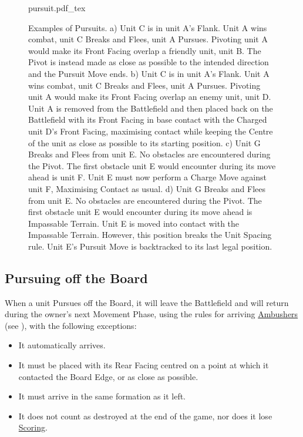 \begin{figure*}[p]
	\renewcommand{\figbiglettersize}{17}
	\begin{minipage}{0.53\textwidth}
	\def\svgwidth{\textwidth}
	{pursuit.pdf_tex}
	\end{minipage}\hfill\begin{minipage}{0.44\textwidth}
	\caption{Examples of Pursuits.\captionposttitle
		a) Unit C is in unit A's Flank. Unit A wins combat, unit C Breaks and Flees, unit A Pursues. Pivoting unit A would make its Front Facing overlap a friendly unit, unit B. The Pivot is instead made as close as possible to the intended direction and the Pursuit Move ends.\vspace*{1.5cm}\captionpar
		b) Unit C is in unit A's Flank. Unit A wins combat, unit C Breaks and Flees, unit A Pursues. Pivoting unit A would make its Front Facing overlap an enemy unit, unit D. Unit A is removed from the Battlefield and then placed back on the Battlefield with its Front Facing in base contact with the Charged unit D's Front Facing, maximising contact while keeping the Centre of the unit as close as possible to its starting position.\vspace*{3.5cm}\captionpar
		c) Unit G Breaks and Flees from unit E. No obstacles are encountered during the Pivot. The first obstacle unit E would encounter during its move ahead is unit F. Unit E must now perform a Charge Move against unit F, Maximising Contact as usual.\vspace*{4cm}\captionpar
		d) Unit G Breaks and Flees from unit E. No obstacles are encountered during the Pivot. The first obstacle unit E would encounter during its move ahead is Impassable Terrain. Unit E is moved into contact with the Impassable Terrain. However, this position breaks the Unit Spacing rule. Unit E's Pursuit Move is backtracked to its last legal position.\vspace*{1cm}%
	}
	\label{figure/pursuit}
	\end{minipage}
\end{figure*}

\subsection{Pursuing off the Board}
\label{pursuing_off_the_board}

When a unit Pursues off the Board, it will leave the Battlefield and will return during the owner's next Movement Phase, using the rules for arriving \hyperref[ambush]{Ambushers} (see ), with the following exceptions:
\begin{itemize}
	\item It automatically arrives.
	\item It must be placed with its Rear Facing centred on a point at which it contacted the Board Edge, or as close as possible.
	\item It must arrive in the same formation as it left.
	\item It does not count as destroyed at the end of the game, nor does it lose \hyperref[scoring]{Scoring}.
\end{itemize}


